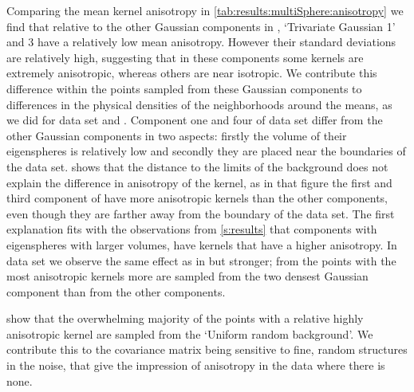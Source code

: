 			Comparing the mean kernel anisotropy in \cref{tab:results:multiSphere:anisotropy} we find that relative to the other Gaussian components in \ferdosiThree, `Trivariate Gaussian 1' and 3 have a relatively low mean anisotropy. However their standard deviations are relatively high, suggesting that in these components some kernels are extremely anisotropic, whereas others are near isotropic. We contribute this difference within the points sampled from these Gaussian components to differences in the physical densities of the neighborhoods around the means, as we did for data set \ferdosiOne and \baakmanOne.
			Component one and four of data set \ferdosiThree differ from the other Gaussian components in two aspects: firstly the volume of their eigenspheres is relatively low and secondly they are placed near the boundaries of the data set. 
				 shows that the distance to the limits of the background does not explain the difference in anisotropy of the kernel, as in that figure the first and third component of \ferdosiThreeNoise have more anisotropic kernels than the other components, even though they are farther away from the boundary of the data set.
				The first explanation fits with the observations from \cref{s:results} that components with eigenspheres with larger volumes, have kernels that have a higher anisotropy.
			In data set \baakmanThree we observe the same effect as in \ferdosiThree but stronger; from the points with the most anisotropic kernels more are sampled from the two densest Gaussian component than from the other components. 

	 show that the overwhelming majority of the points with a relative highly anisotropic kernel are sampled from the `Uniform random background'. We contribute this to the covariance matrix being sensitive to fine, random structures in the noise, that give the impression of anisotropy in the data where there is none.

